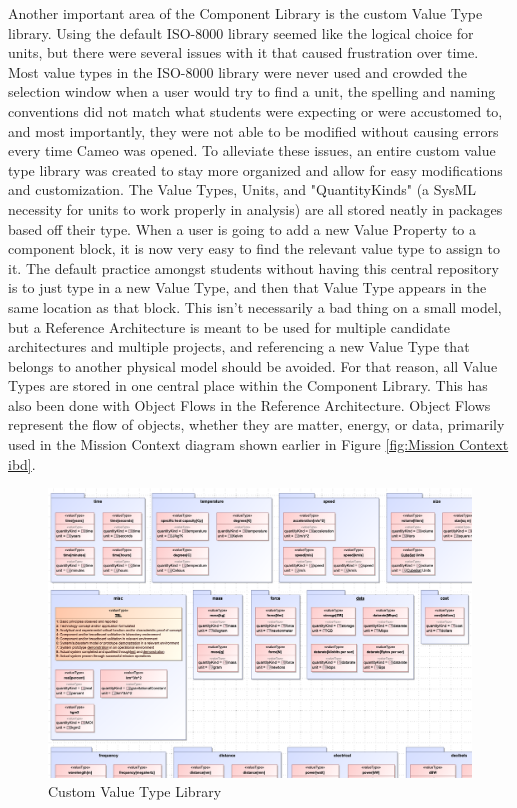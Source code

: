 Another important area of the Component Library is the custom Value Type library. Using the default ISO-8000 library seemed like the logical choice for units, but there were several issues with it that caused frustration over time. Most value types in the ISO-8000 library were never used and crowded the selection window when a user would try to find a unit, the spelling and naming conventions did not match what students were expecting or were accustomed to, and most importantly, they were not able to be modified without causing errors every time Cameo was opened. To alleviate these issues, an entire custom value type library was created to stay more organized and allow for easy modifications and customization. The Value Types, Units, and "QuantityKinds" (a SysML necessity for units to work properly in analysis) are all stored neatly in packages based off their type. When a user is going to add a new Value Property to a component block, it is now very easy to find the relevant value type to assign to it. The default practice amongst students without having this central repository is to just type in a new Value Type, and then that Value Type appears in the same location as that block. This isn't necessarily a bad thing on a small model, but a Reference Architecture is meant to be used for multiple candidate architectures and multiple projects, and referencing a new Value Type that belongs to another physical model should be avoided. For that reason, all Value Types are stored in one central place within the Component Library. This has also been done with Object Flows in the Reference Architecture. Object Flows represent the flow of objects, whether they are matter, energy, or data, primarily used in the Mission Context diagram shown earlier in Figure \ref{fig:Mission Context ibd}.

\begin{figure}[H]
    \centering
    \includegraphics[scale=0.4, angle=90]{Thesis/Analysis_and_Results/Analysis and Results Figures/Value Types.png}
    \caption{Custom Value Type Library}
    \label{fig:Custom Value Type Library}
\end{figure}